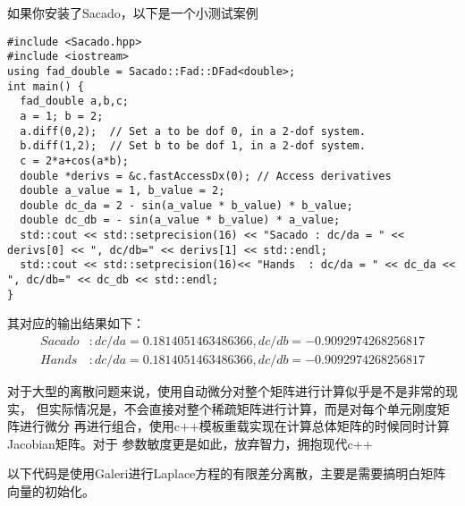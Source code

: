 如果你安装了Sacado，以下是一个小测试案例

\begin{lstlisting}
#include <Sacado.hpp>
#include <iostream>
using fad_double = Sacado::Fad::DFad<double>;
int main() {
  fad_double a,b,c;
  a = 1; b = 2;
  a.diff(0,2);  // Set a to be dof 0, in a 2-dof system.
  b.diff(1,2);  // Set b to be dof 1, in a 2-dof system.
  c = 2*a+cos(a*b);
  double *derivs = &c.fastAccessDx(0); // Access derivatives
  double a_value = 1, b_value = 2;
  double dc_da = 2 - sin(a_value * b_value) * b_value;
  double dc_db = - sin(a_value * b_value) * a_value;
  std::cout << std::setprecision(16) << "Sacado : dc/da = " << derivs[0] << ", dc/db=" << derivs[1] << std::endl;
  std::cout << std::setprecision(16)<< "Hands  : dc/da = " << dc_da << ", dc/db=" << dc_db << std::endl;
}
\end{lstlisting}

其对应的输出结果如下：
\[
\begin{aligned}
Sacado &: dc/da = 0.1814051463486366, dc/db=-0.9092974268256817\\
Hands  &: dc/da = 0.1814051463486366, dc/db=-0.9092974268256817    
\end{aligned}
\]

对于大型的离散问题来说，使用自动微分对整个矩阵进行计算似乎是不是非常的现实，
但实际情况是，不会直接对整个稀疏矩阵进行计算，而是对每个单元刚度矩阵进行微分
再进行组合，使用c++模板重载实现在计算总体矩阵的时候同时计算Jacobian矩阵。对于
参数敏度更是如此，放弃智力，拥抱现代c++

以下代码是使用Galeri进行Laplace方程的有限差分离散，主要是需要搞明白矩阵向量的初始化。

